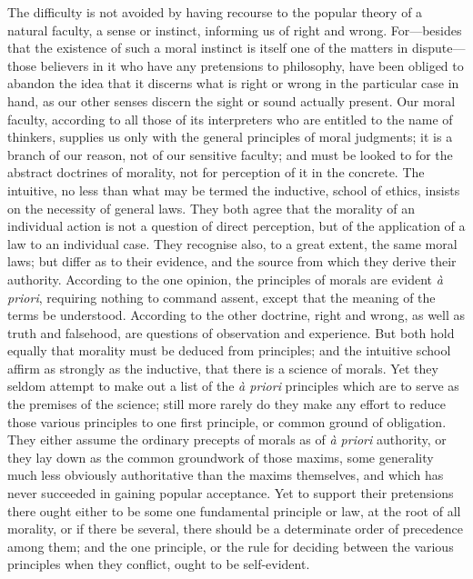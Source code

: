 \documentclass[12pt]{report}
\begin{document}
The difficulty is not avoided by having recourse to the popular theory of a natural faculty, a sense or instinct, informing us of right and wrong. For—besides that the existence of such a moral instinct is itself one of the matters in dispute—those believers in it who have any pretensions to philosophy, have been obliged to abandon the idea that it discerns what is right or wrong in the particular case in hand, as our other senses discern the sight or sound actually present. Our moral faculty, according to all those of its interpreters who are entitled to the name of thinkers, supplies us only with the general principles of moral judgments; it is a branch of our reason, not of our sensitive faculty; and must be looked to for the abstract doctrines of morality, not for perception of it in the concrete. The intuitive, no less than what may be termed the inductive, school of ethics, insists on the necessity of general laws. They both agree that the morality of an individual action is not a question of direct perception, but of the application of a law to an individual case. They recognise also, to a great extent, the same moral laws; but differ as to their evidence, and the source from which they derive their authority. According to the one opinion, the principles of morals are evident \emph{à priori}, requiring nothing to command assent, except that the meaning of the terms be understood. According to the other doctrine, right and wrong, as well as truth and falsehood, are questions of observation and experience. But both hold equally that morality must be deduced from principles; and the intuitive school affirm as strongly as the inductive, that there is a science of morals. Yet they seldom attempt to make out a list of the \emph{à priori} principles which are to serve as the premises of the science; still more rarely do they make any effort to reduce those various principles to one first principle, or common ground of obligation. They either assume the ordinary precepts of morals as of \emph{à priori} authority, or they lay down as the common groundwork of those maxims, some generality much less obviously authoritative than the maxims themselves, and which has never succeeded in gaining popular acceptance. Yet to support their pretensions there ought either to be some one fundamental principle or law, at the root of all morality, or if there be several, there should be a determinate order of precedence among them; and the one principle, or the rule for deciding between the various principles when they conflict, ought to be self-evident.
\end{document}
